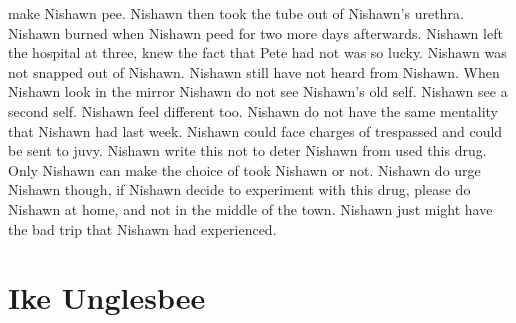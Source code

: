 \documentclass[12pt]{book}
\begin{document}
make Nishawn pee. Nishawn then took the tube out of Nishawn's urethra. Nishawn burned when Nishawn peed for two more days afterwards. Nishawn left the hospital at three, knew the fact that Pete had not was so lucky. Nishawn was not snapped out of Nishawn. Nishawn still have not heard from Nishawn. When Nishawn look in the mirror Nishawn do not see Nishawn's old self. Nishawn see a second self. Nishawn feel different too. Nishawn do not have the same mentality that Nishawn had last week. Nishawn could face charges of trespassed and could be sent to juvy. Nishawn write this not to deter Nishawn from used this drug. Only Nishawn can make the choice of took Nishawn or not. Nishawn do urge Nishawn though, if Nishawn decide to experiment with this drug, please do Nishawn at home, and not in the middle of the town. Nishawn just might have the bad trip that Nishawn had experienced.



\chapter{Ike Unglesbee}
\end{document}
